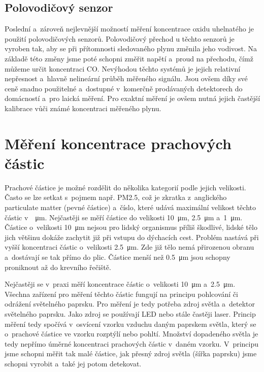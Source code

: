 \subsection{Polovodičový senzor}

Poslední a~zároveň nejlevnější možností měření koncentrace oxidu uhelnatého je použití polovodičových senzorů. Polovodičový přechod u těchto senzorů je vyroben tak, aby se při přítomnosti sledovaného plynu změnila jeho vodivost. Na základě této změny jsme poté schopni změřit napětí a~proud na přechodu, čímž můžeme určit koncentraci CO. Nevýhodou těchto systémů je jejich relativní nepřesnost a~hlavně nelineární průběh měřeného signálu. Jsou ovšem díky své ceně snadno použitelné a~dostupné v~komerčně prodávaných detektorech do domácností a~pro laická měření. Pro exaktní měření je ovšem nutná jejich častější kalibrace vůči známé koncentraci měřeného plynu.

\section{Měření koncentrace prachových částic}

Prachové částice je možné rozdělit do několika kategorií podle jejich velikosti. Často se lze setkat s~pojmem např. PM2.5, což je zkratka z~anglického particulate matter (pevné částice) a~číslo, které udává maximální velikost těchto částic v~\SI{}{\micro\metre}. Nejčastěji se měří částice do velikosti \SI{10}{\micro\metre}, \SI{2,5}{\micro\metre} a~\SI{1}{\micro\metre}. Částice o~velikosti \SI{10}{\micro\metre} nejsou pro lidský organismus příliš škodlivé, lidské tělo jich většinu dokáže zachytit již při vstupu do dýchacích cest. Problém nastává při vyšší koncentraci částic o~velikosti \SI{2,5}{\micro\metre}. Zde již tělo nemá přirozenou obranu a~dostávají se tak přímo do plic. Částice menší než \SI{0,5}{\micro\metre} jsou schopny proniknout až do krevního řečiště.

Nejčastěji se v~praxi měří koncentrace částic o~velikosti \SI{10}{\micro\metre} a~\SI{2,5}{\micro\metre}. Všechna zařízení pro měření těchto částic fungují na principu pohlcování či odrážení světelného paprsku. Pro měření je tedy potřeba zdroj světla a~detektor světelného paprsku. Jako zdroj se používají LED nebo stále častěji laser. Princip měření tedy spočívá v~osvícení vzorku vzduchu daným paprskem světla, který se o~prachové částice ve vzorku rozptýlí nebo pohltí. Množství dopadeného světla je tedy nepřímo úměrné koncentraci prachových částic v~daném vzorku. V~principu jsme schopni měřit tak malé částice, jak přesný zdroj světla (šířka paprsku) jsme schopni vyrobit a~také jej potom detekovat.

